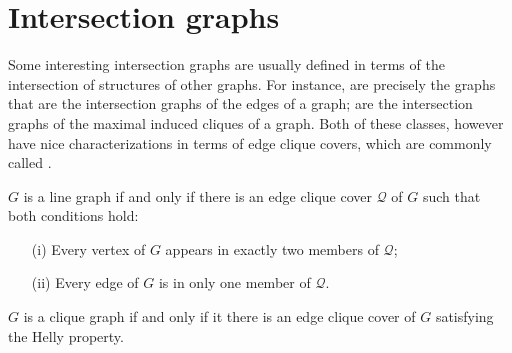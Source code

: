 \section{Intersection graphs}
\label{sec:intersections}

Some interesting intersection graphs are usually defined in terms of the intersection of structures of other graphs. For instance,  are precisely the graphs that are the intersection graphs of the edges of a graph;  are the intersection graphs of the maximal induced cliques of a graph.
Both of these classes, however have nice characterizations in terms of edge clique covers, which are commonly called .

\begin{class_definition*}
    $G$ is a line graph if and only if there is an edge clique cover $\mathcal{Q}$ of $G$ such that both conditions hold:
        \begin{itemize}
            \item[(i)] Every vertex of $G$ appears in exactly two members of $\mathcal{Q}$;
            \item[(ii)] Every edge of $G$ is in only one member of $\mathcal{Q}$.
        \end{itemize}
\end{class_definition*}

\begin{class_definition*}
    $G$ is a clique graph if and only if it there is an edge clique cover of $G$ satisfying the Helly property.
\end{class_definition*}

